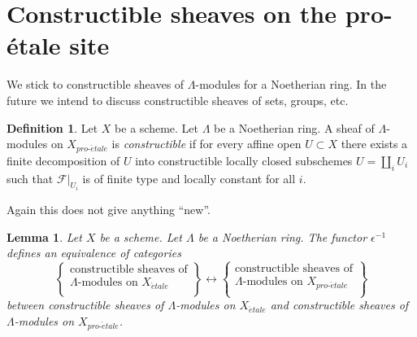 \documentclass{stacks-project}
\theoremstyle{plain}
\newtheorem{lemma}[subsection]{Lemma}
\theoremstyle{definition}
\newtheorem{definition}[subsection]{Definition}
\theoremstyle{remark}
\numberwithin{equation}{subsection}
\def\proetale{{pro\text{-}\acute{e}tale}}
\def\etale{{\acute{e}tale}}
\begin{document}
\section{Constructible sheaves on the pro-\'etale site}
\label{section-constructible}

\noindent
We stick to constructible sheaves of $\Lambda$-modules for a
Noetherian ring. In the future we intend to discuss constructible
sheaves of sets, groups, etc.

\begin{definition}
\label{definition-constructible}
Let $X$ be a scheme.
Let $\Lambda$ be a Noetherian ring. A sheaf of $\Lambda$-modules
on $X_\proetale$ is {\it constructible} if for every affine open
$U \subset X$ there exists a finite decomposition
of $U$ into constructible locally closed subschemes
$U = \coprod_i U_i$ such that
$\mathcal{F}|_{U_i}$ is of finite type and locally constant for all $i$.
\end{definition}

\noindent
Again this does not give anything ``new''.

\begin{lemma}
\label{lemma-compare-constructible}
Let $X$ be a scheme. Let $\Lambda$ be a Noetherian ring.
The functor $\epsilon^{-1}$ defines an equivalence of categories
$$
\left\{
\begin{matrix}
\text{constructible sheaves of}\\
\Lambda\text{-modules on }X_\etale\\
\end{matrix}
\right\}
\longleftrightarrow
\left\{
\begin{matrix}
\text{constructible sheaves of}\\
\Lambda\text{-modules on }X_\proetale\\
\end{matrix}
\right\}
$$
between constructible sheaves of $\Lambda$-modules on $X_\etale$
and constructible sheaves of $\Lambda$-modules on $X_\proetale$.
\end{lemma}
\end{document}
